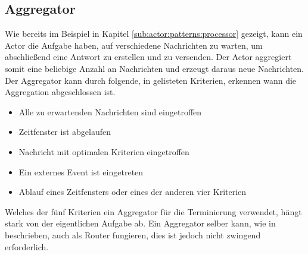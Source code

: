 \subsection{Aggregator}\label{sec:actor:patterns:aggregator}
Wie bereits im Beispiel in Kapitel \ref{sub:actor:patterns:processor} gezeigt, kann ein Actor die Aufgabe haben, auf verschiedene Nachrichten zu warten, um abschließend eine Antwort zu erstellen und zu versenden. Der Actor aggregiert somit eine beliebige Anzahl an Nachrichten und erzeugt daraus neue Nachrichten. \\
Der Aggregator kann durch folgende, in \cite{Vernon2015ReactiveAkka} gelisteten Kriterien, erkennen wann die Aggregation abgeschlossen ist.
\begin{itemize}
    \item Alle zu erwartenden Nachrichten sind eingetroffen
    \item Zeitfenster ist abgelaufen
    \item Nachricht mit optimalen Kriterien eingetroffen
    \item Ein externes Event ist eingetreten
    \item Ablauf eines Zeitfensters oder eines der anderen vier Kriterien
\end{itemize}
Welches der fünf Kriterien ein Aggregator für die Terminierung verwendet, hängt stark von der eigentlichen Aufgabe ab. Ein Aggregator selber kann, wie in \cite{Vernon2015ReactiveAkka} beschrieben, auch als Router fungieren, dies ist jedoch nicht zwingend erforderlich.

